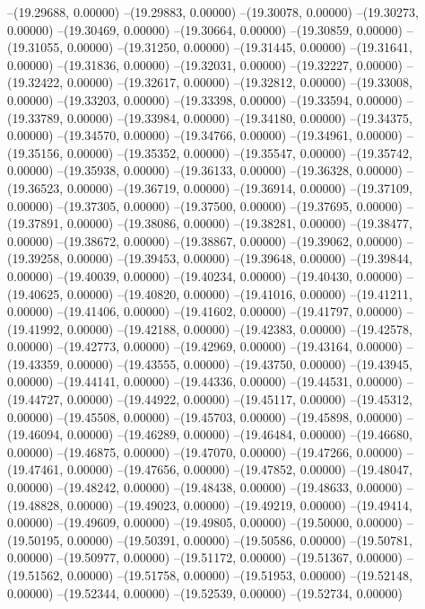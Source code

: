 --(19.29688, 0.00000)
--(19.29883, 0.00000)
--(19.30078, 0.00000)
--(19.30273, 0.00000)
--(19.30469, 0.00000)
--(19.30664, 0.00000)
--(19.30859, 0.00000)
--(19.31055, 0.00000)
--(19.31250, 0.00000)
--(19.31445, 0.00000)
--(19.31641, 0.00000)
--(19.31836, 0.00000)
--(19.32031, 0.00000)
--(19.32227, 0.00000)
--(19.32422, 0.00000)
--(19.32617, 0.00000)
--(19.32812, 0.00000)
--(19.33008, 0.00000)
--(19.33203, 0.00000)
--(19.33398, 0.00000)
--(19.33594, 0.00000)
--(19.33789, 0.00000)
--(19.33984, 0.00000)
--(19.34180, 0.00000)
--(19.34375, 0.00000)
--(19.34570, 0.00000)
--(19.34766, 0.00000)
--(19.34961, 0.00000)
--(19.35156, 0.00000)
--(19.35352, 0.00000)
--(19.35547, 0.00000)
--(19.35742, 0.00000)
--(19.35938, 0.00000)
--(19.36133, 0.00000)
--(19.36328, 0.00000)
--(19.36523, 0.00000)
--(19.36719, 0.00000)
--(19.36914, 0.00000)
--(19.37109, 0.00000)
--(19.37305, 0.00000)
--(19.37500, 0.00000)
--(19.37695, 0.00000)
--(19.37891, 0.00000)
--(19.38086, 0.00000)
--(19.38281, 0.00000)
--(19.38477, 0.00000)
--(19.38672, 0.00000)
--(19.38867, 0.00000)
--(19.39062, 0.00000)
--(19.39258, 0.00000)
--(19.39453, 0.00000)
--(19.39648, 0.00000)
--(19.39844, 0.00000)
--(19.40039, 0.00000)
--(19.40234, 0.00000)
--(19.40430, 0.00000)
--(19.40625, 0.00000)
--(19.40820, 0.00000)
--(19.41016, 0.00000)
--(19.41211, 0.00000)
--(19.41406, 0.00000)
--(19.41602, 0.00000)
--(19.41797, 0.00000)
--(19.41992, 0.00000)
--(19.42188, 0.00000)
--(19.42383, 0.00000)
--(19.42578, 0.00000)
--(19.42773, 0.00000)
--(19.42969, 0.00000)
--(19.43164, 0.00000)
--(19.43359, 0.00000)
--(19.43555, 0.00000)
--(19.43750, 0.00000)
--(19.43945, 0.00000)
--(19.44141, 0.00000)
--(19.44336, 0.00000)
--(19.44531, 0.00000)
--(19.44727, 0.00000)
--(19.44922, 0.00000)
--(19.45117, 0.00000)
--(19.45312, 0.00000)
--(19.45508, 0.00000)
--(19.45703, 0.00000)
--(19.45898, 0.00000)
--(19.46094, 0.00000)
--(19.46289, 0.00000)
--(19.46484, 0.00000)
--(19.46680, 0.00000)
--(19.46875, 0.00000)
--(19.47070, 0.00000)
--(19.47266, 0.00000)
--(19.47461, 0.00000)
--(19.47656, 0.00000)
--(19.47852, 0.00000)
--(19.48047, 0.00000)
--(19.48242, 0.00000)
--(19.48438, 0.00000)
--(19.48633, 0.00000)
--(19.48828, 0.00000)
--(19.49023, 0.00000)
--(19.49219, 0.00000)
--(19.49414, 0.00000)
--(19.49609, 0.00000)
--(19.49805, 0.00000)
--(19.50000, 0.00000)
--(19.50195, 0.00000)
--(19.50391, 0.00000)
--(19.50586, 0.00000)
--(19.50781, 0.00000)
--(19.50977, 0.00000)
--(19.51172, 0.00000)
--(19.51367, 0.00000)
--(19.51562, 0.00000)
--(19.51758, 0.00000)
--(19.51953, 0.00000)
--(19.52148, 0.00000)
--(19.52344, 0.00000)
--(19.52539, 0.00000)
--(19.52734, 0.00000)
